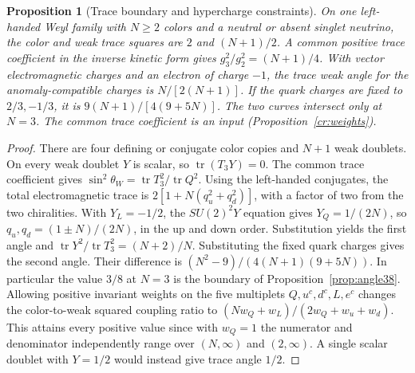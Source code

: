 \documentclass[aps,pra,onecolumn,superscriptaddress,nofootinbib,10pt]{revtex4-2}
\newtheorem{proposition}[theorem]{Proposition}
\theoremstyle{definition}
\theoremstyle{remark}
\begin{document}
\begin{proposition}[Trace boundary and hypercharge constraints]\label{ub:traces}
On one left-handed Weyl family with $N\ge2$ colors and a neutral or absent
singlet neutrino, the color and weak trace squares are $2$ and $(N+1)/2$.
A common positive trace coefficient in the inverse kinetic form gives
$g_3^2/g_2^2=(N+1)/4$. With vector electromagnetic charges and an electron
of charge $-1$, the trace weak angle for the anomaly-compatible charges is
$N/[2(N+1)]$. If the quark charges are fixed to $2/3,-1/3$, it is
$9(N+1)/[4(9+5N)]$. The two curves intersect only at $N=3$.  The common trace coefficient is an input
(Proposition~\ref{cr:weights}).
\end{proposition}
\begin{proof}
There are four defining or conjugate color copies and $N+1$ weak doublets.
On every weak doublet $Y$ is scalar, so $\operatorname{tr}(T_3Y)=0$.
The common trace coefficient gives
$\sin^2\theta_W=\operatorname{tr}T_3^2/\operatorname{tr}Q^2$.
Using the left-handed conjugates, the total electromagnetic trace is
$2[1+N(q_u^2+q_d^2)]$, with a factor of two from the two chiralities.
With $Y_L=-1/2$, the $SU(2)^2Y$ equation gives $Y_Q=1/(2N)$, so
$q_u,q_d=(1\pm N)/(2N)$, in the up and down order. Substitution yields
the first angle and $\operatorname{tr}Y^2/\operatorname{tr}T_3^2=(N+2)/N$.
Substituting the fixed quark charges gives the second angle. Their
difference is $(N^2-9)/(4(N+1)(9+5N))$. In particular the value $3/8$
at $N=3$ is the boundary of Proposition~\ref{prop:angle38}.
Allowing positive invariant weights on the five multiplets
$Q,u^c,d^c,L,e^c$ changes the color-to-weak squared coupling ratio to
$(Nw_Q+w_L)/(2w_Q+w_u+w_d)$. This attains every positive value
since with $w_Q=1$ the numerator and denominator independently range
over $(N,\infty)$ and $(2,\infty)$. A single scalar doublet with $Y=1/2$
would instead give trace angle $1/2$.
\end{proof}
\end{document}
